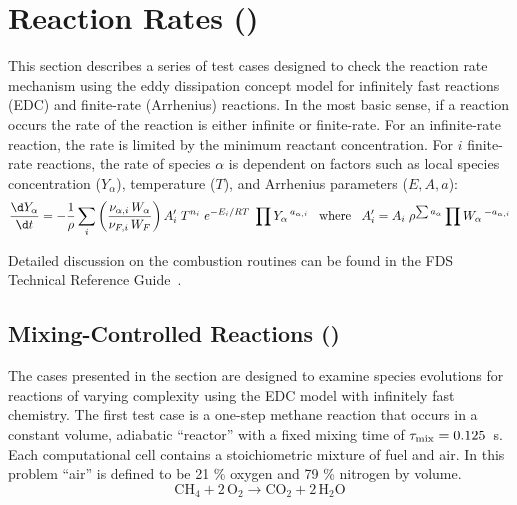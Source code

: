 \documentclass[11pt]{book}
\begin{document}
\section{Reaction Rates (\texorpdfstring{}{reactionrate})}

This section describes a series of test cases designed to check the reaction rate mechanism using the eddy dissipation concept model for infinitely fast reactions (EDC) and  finite-rate (Arrhenius) reactions. In the most basic sense, if a reaction occurs the rate of the reaction is either infinite or finite-rate. For an infinite-rate reaction, the rate is limited by the minimum reactant concentration. For $i$ finite-rate reactions, the rate of species $\alpha$ is dependent on factors such as local species concentration ($Y_{\alpha}$), temperature ($T$), and Arrhenius parameters ($E,A,a$):
\begin{equation}\label{eq:finite_rate1}
\frac{\d Y_{\alpha}}{\d t} = -\frac{1}{\rho}\sum_{i} \left(\frac{\nu_{\alpha,i}\,W_{\alpha}}{\nu_{F,i}\,W_{F}}\right)A_i^{\prime}\;T^{n_i}\;e^{-E_i/RT}\;\prod Y_{\alpha}\,^{a_{\alpha,i}} \;\;\; \text{where} \;\;\; A^{\prime}_{i} = A_{i}\;\rho^{\sum a_{\alpha}}\prod W_{\alpha}\,^{-a_{\alpha,i}}
\end{equation}

Detailed discussion on the combustion routines can be found in the FDS Technical Reference Guide~\cite{FDS_Tech_Guide}.

\subsection{Mixing-Controlled Reactions (\texorpdfstring{}{reactionrate\_EDC})}
\label{mixing_reactions}
\label{reactionrate_EDC_flim_1step_CH4}
\label{reactionrate_EDC_flim_1step_C3H8}
\label{reactionrate_EDC_1step_CH4_nonmix}
\label{reactionrate_EDC_O2lim_1step}
\label{reactionrate_EDC_O2lim_2fuel}
\label{reactionrate_series_reaction}
\label{reactionrate_EDC_flim_2step}
\label{reactionrate_lumped_two_air}

The cases presented in the section are designed to examine species evolutions for reactions of varying complexity using the EDC model with infinitely fast chemistry. The first test case is a one-step methane reaction that occurs in a constant volume, adiabatic ``reactor'' with a fixed mixing time of $\tau_{\rm mix}=0.125$~s. Each computational cell contains a stoichiometric mixture of fuel and air. In this problem ``air'' is defined to be 21 \% oxygen and 79 \% nitrogen by volume.
\begin{equation}\label{eq:1step_methane}
\mathrm{CH_4 + 2\, O_2 \rightarrow  CO_2 + 2\, H_2O}
\end{equation}
\end{document}
